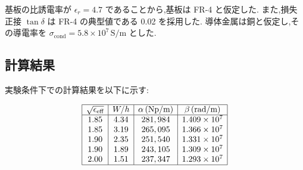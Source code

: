\documentclass[a4paper, twocolumn]{article} %
\begin{document}
基板の比誘電率が \( \epsilon_r = 4.7 \) であることから,基板は FR-4 と仮定した. また,損失正接 \( \tan\delta \) は FR-4 の典型値である 0.02 を採用した. 導体金属は銅と仮定し,その導電率を \( \sigma_{\text{cond}} = 5.8 \times 10^7 \, \text{S/m} \) とした.

\subsection{計算結果}
実験条件下での計算結果を以下に示す:

\[
\begin{array}{|c|c|c|c|}
\hline
\sqrt{\epsilon_{\text{eff}}} & W/h & \alpha \, (\text{Np/m}) & \beta \, (\text{rad/m}) \\
\hline
1.85 & 4.34 & 281,984 & 1.409 \times 10^7 \\
1.85 & 3.19 & 265,095 & 1.366 \times 10^7 \\
1.90 & 2.35 & 251,540 & 1.331 \times 10^7 \\
1.90 & 1.89 & 243,105 & 1.309 \times 10^7 \\
2.00 & 1.51 & 237,347 & 1.293 \times 10^7 \\
\hline
\end{array}
\]
\end{document}
